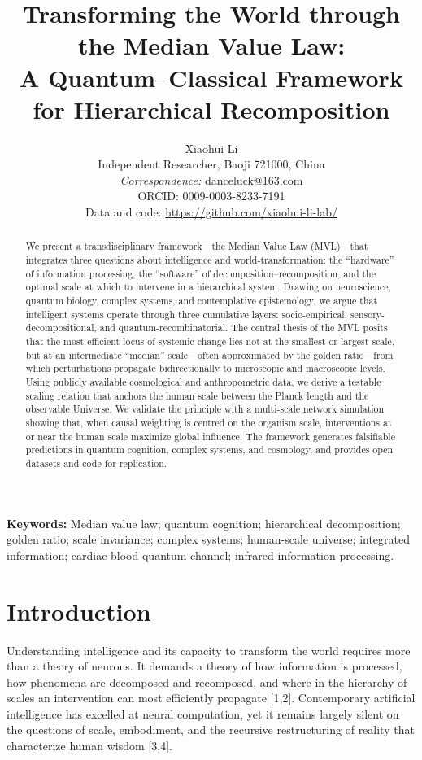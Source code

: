 \documentclass[11pt,a4paper]{article}
\title{\bfseries Transforming the World through the Median Value Law:\\
A Quantum--Classical Framework for Hierarchical Recomposition}
\author{
Xiaohui Li\\
Independent Researcher, Baoji 721000, China\\
\textit{Correspondence:} danceluck@163.com\\
ORCID: 0009-0003-8233-7191\\
Data and code: \url{https://github.com/xiaohui-li-lab/}
}
\date{}
\begin{document}
\maketitle

\begin{abstract}
\noindent
We present a transdisciplinary framework---the Median Value Law (MVL)---that integrates three questions about intelligence and world-transformation: the ``hardware'' of information processing, the ``software'' of decomposition--recomposition, and the optimal scale at which to intervene in a hierarchical system. Drawing on neuroscience, quantum biology, complex systems, and contemplative epistemology, we argue that intelligent systems operate through three cumulative layers: socio-empirical, sensory-decompositional, and quantum-recombinatorial. The central thesis of the MVL posits that the most efficient locus of systemic change lies not at the smallest or largest scale, but at an intermediate ``median'' scale---often approximated by the golden ratio---from which perturbations propagate bidirectionally to microscopic and macroscopic levels. Using publicly available cosmological and anthropometric data, we derive a testable scaling relation that anchors the human scale between the Planck length and the observable Universe. We validate the principle with a multi-scale network simulation showing that, when causal weighting is centred on the organism scale, interventions at or near the human scale maximize global influence. The framework generates falsifiable predictions in quantum cognition, complex systems, and cosmology, and provides open datasets and code for replication.
\end{abstract}

\noindent\textbf{Keywords:} Median value law; quantum cognition; hierarchical decomposition; golden ratio; scale invariance; complex systems; human-scale universe; integrated information; cardiac-blood quantum channel; infrared information processing.

\section{Introduction}

Understanding intelligence and its capacity to transform the world requires more than a theory of neurons. It demands a theory of how information is processed, how phenomena are decomposed and recomposed, and where in the hierarchy of scales an intervention can most efficiently propagate [1,2]. Contemporary artificial intelligence has excelled at neural computation, yet it remains largely silent on the questions of scale, embodiment, and the recursive restructuring of reality that characterize human wisdom [3,4].
\end{document}
